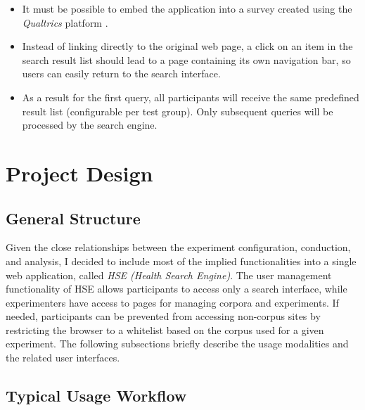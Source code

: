 \documentclass[a4paper]{usiinfbachelorproject}
\begin{document}
\begin{itemize}

    \item It must be possible to embed the application into a survey created using the \emph{Qualtrics} platform \cite{qualtricsHome}. 

    \item Instead of linking directly to the original web page, a click on an item in the search result list should lead
to a page containing its own navigation bar, so users can easily return to the search interface.

    \item As a result for the first query, all participants will receive the same predefined result list (configurable per
test group). Only subsequent queries will be processed by the search engine.

\end{itemize}

\section{\textbf{Project Design}} \label{sec:design}

\subsection{\textbf{General Structure}} \label{sec:designGeneral}

Given the close relationships between the experiment configuration, conduction, and analysis, I decided to include
most of the implied functionalities into a single web application, called \emph{HSE (Health Search Engine)}.
The user management functionality of HSE allows participants to access only a search interface, while experimenters
have access to pages for managing corpora and experiments. If needed, participants can be prevented from
accessing non-corpus sites by restricting the browser to a whitelist based on the corpus used for a given experiment.
The following subsections briefly describe the usage modalities and the related user interfaces.

\subsection{\textbf{Typical Usage Workflow}} \label{sec:designWorkflow}
\end{document}
